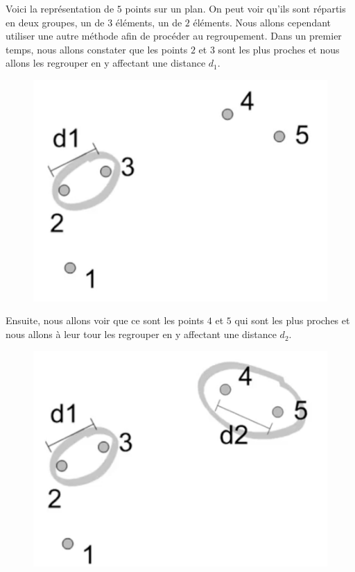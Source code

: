 Voici la représentation de $5$ points sur un plan. On peut voir qu'ils sont répartis en deux groupes, un de $3$ éléments, un de $2$ éléments. Nous allons cependant utiliser une autre méthode afin de procéder au regroupement.\newline
Dans un premier temps, nous allons constater que les points $2$ et $3$ sont les plus proches et nous allons les regrouper en y affectant une distance $d_{1}$.
\begin{figure}[H]\begin{center}\includegraphics[scale=0.5]{ilu/ClassHierarpts23.png}\end{center}\end{figure}
Ensuite, nous allons voir que ce sont les points $4$ et $5$ qui sont les plus proches et nous allons à leur tour les regrouper en y affectant une distance $d_{2}$.
\begin{figure}[H]\begin{center}\includegraphics[scale=0.5]{ilu/ClassHierarpts45.png}\end{center}\end{figure}

